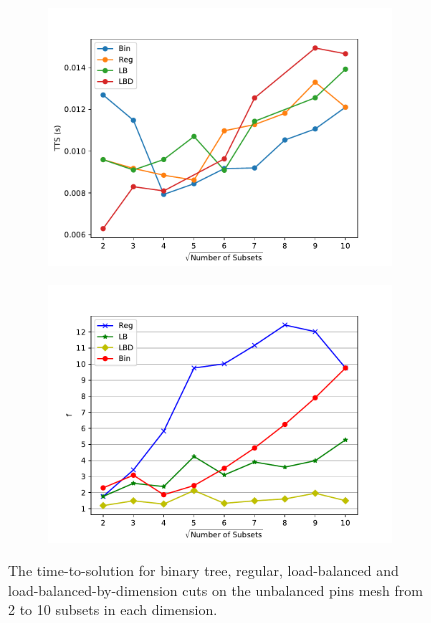 \begin{figure}[h]
\centering
  \begin{subfigure}[t]{0.49\textwidth}
    \centering
  \includegraphics[scale=0.55]{../../figures/unbalanced_pins_opt_comparison.pdf}
  \end{subfigure}
   \begin{subfigure}[t]{0.49\textwidth}
   \centering
   \includegraphics[scale=0.55]{../../figures/spiderweb_metric_study_bad.pdf}
   \end{subfigure}
  \caption{The time-to-solution for binary tree, regular, load-balanced and load-balanced-by-dimension cuts on the unbalanced pins mesh from 2 to 10 subsets in each dimension.}
  \label{ubp_comp1}
\end{figure}

